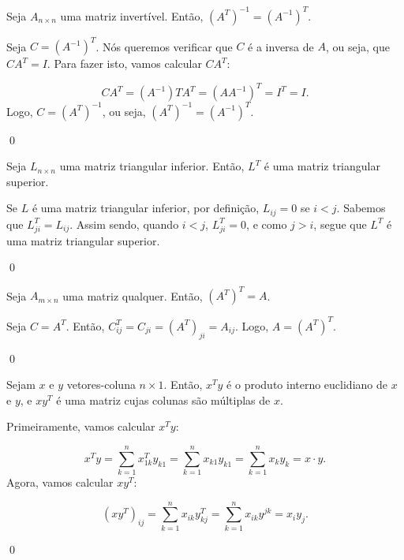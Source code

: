 \begin{Proposition}
	Seja $A_{n\times n}$ uma matriz invertível. Então, $(A^T)^{-1} = (A^{-1})^T$.
\end{Proposition}

\begin{Proof}
	Seja $C = (A^{-1})^T$. Nós queremos verificar que $C$ é a inversa de $A$, ou seja, que $CA^T = I$. Para fazer isto, vamos calcular $CA^T$:
	
	$$
	CA^T = (A^{-1})TA^T = (AA^{-1})^T = I^T = I.
	$$
	Logo, $C = (A^T)^{-1}$, ou seja, $(A^T)^{-1} = (A^{-1})^T$.
	
	\qed
\end{Proof}

\begin{Proposition}
	Seja $L_{n\times n}$ uma matriz triangular inferior. Então, $L^T$ é uma matriz triangular superior.
\end{Proposition}

\begin{Proof}
	Se $L$ é uma matriz triangular inferior, por definição, $L_{ij} = 0$ se $i < j$. Sabemos que $L^T_{ji} = L_{ij}$. Assim sendo, quando $i < j$, $L^T_{ji} = 0$, e como $j > i$, segue que $L^T$ é uma matriz triangular superior.
	
	\qed
\end{Proof}

\begin{Proposition}
	Seja $A_{m\times n}$ uma matriz qualquer. Então, $(A^T)^T = A$.
\end{Proposition}

\begin{Proof}
	Seja $C = A^T$. Então, $C^T_{ij} = C_{ji} = (A^T)_{ji} = A_{ij}$. Logo, $A = (A^T)^T$.
	
	\qed
\end{Proof}

\begin{Proposition}
	Sejam $x$ e $y$ vetores-coluna $n\times 1$. Então, $x^Ty$ é o produto interno euclidiano de $x$ e $y$, e $xy^T$ é uma matriz cujas colunas são múltiplas de $x$.
\end{Proposition}

\begin{Proof}
	Primeiramente, vamos calcular $x^Ty$:
	
	$$
	x^Ty = \sum\limits_{k = 1}^{n} x^T_{1k}y_{k1} = \sum\limits_{k = 1}^{n} x_{k1}y_{k1} = \sum\limits_{k = 1}^{n} x_ky_k = x\cdot y.
	$$
	Agora, vamos calcular $xy^T$:
	
	$$
	(xy^T)_{ij} = \sum\limits_{k = 1}^{n} x_{ik}y^T_{kj} = \sum\limits_{k = 1}^{n} x_{ik} y^{jk} = x_iy_j.
	$$
	
	\qed
\end{Proof}

